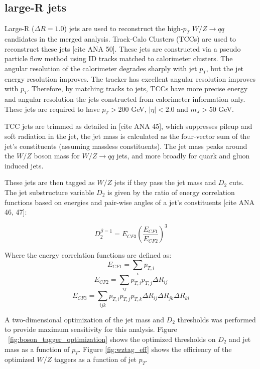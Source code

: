 \subsection{large-R jets}
Large-R ($\Delta R = 1.0$) jets are used to reconstruct the high-$p_{T}$ $W/Z \rightarrow qq$ candidates in the merged analysis. Track-Calo Clusters (TCCs) are used to reconstruct these jets [cite ANA 50]. These jets are constructed via a pseudo particle flow method using ID tracks matched to calorimeter clusters. The angular resolution of the calorimeter degrades sharply with jet $p_{T}$, but the jet energy resolution improves. The tracker has excellent angular resolution improves with $p_{T}$. Therefore, by matching tracks to jets, TCCs have more precise energy and angular resolution the jets constructed from calorimeter information only. These jets are required to have $p_{T}>200$ GeV, $|\eta| < 2.0$ and $m_{J} > 50$ GeV. 

TCC jets are trimmed as detailed in [cite ANA 45], which suppresses pileup and soft radiation in the jet, the jet mass is calculated as the four-vector sum of the jet's constituents (assuming massless constituents). The jet mass peaks around the $W/Z$ boson mass for $W/Z \rightarrow qq$ jets, and more broadly for quark and gluon induced jets. 

These jets are then tagged as $W/Z$ jets if they pass the jet mass and $D_{2}$ cuts. The jet substructure variable $D_{2}$ is given by the ratio of energy correlation functions based on energies and pair-wise angles of a jet's constituents [cite ANA 46, 47]:

\begin{equation}
D_{2}^{\beta=1} = E_{CF3}\left(\frac{E_{CF1}}{E_{CF2}}\right)^{3}
\end{equation}

Where the energy correlation functions are defined as:
\begin{equation}
E_{CF1}=\sum_{i}p_{T,i}
\end{equation}
\begin{equation}
E_{CF2}=\sum_{ij}p_{T,i}p_{T,j}\Delta R_{ij}
\end{equation}
\begin{equation}
E_{CF3}=\sum_{ijk}p_{T,i}p_{T,j}p_{T,k}\Delta R_{ij}\Delta R_{jk}\Delta R_{ki}
\end{equation}

A two-dimensional optimization of the jet mass and $D_{2}$ thresholds was performed to provide maximum sensitivity for this analysis. Figure ~\ref{fig:boson_tagger_optimization} shows the optimized thresholds on $D_{2}$ and jet mass as a function of $p_{T}$. Figure \ref{fig:wztag_eff} shows the efficiency of the optimized $W/Z$ taggers as a function of jet $p_{T}$. 


